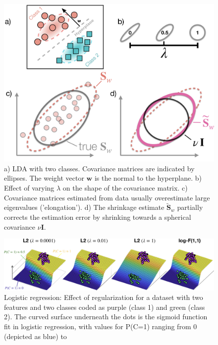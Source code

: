 \documentclass[utf8]{frontiersSCNS} %
\newcommand{\w}{\mathbf{w}}
\renewcommand{\S}{\mathbf{S}}
\begin{document}
\begin{figure}[ht!]
\centering\includegraphics[width=\linewidth]{figures/LDA_regularization}
\caption{a) LDA with two classes. Covariance matrices are indicated by ellipses. The weight vector $\w$ is the normal to the hyperplane. b) Effect of varying $\lambda$ on the shape of the covariance matrix. c) Covariance matrices estimated from data usually overestimate large eigenvalues ('elongation'). d) The shrinkage estimate $\widetilde{\S}_w$ partially corrects the estimation error by shrinking towards a spherical covariance $\nu\mathbf{I}$.}\label{fig:lda}
\end{figure}

\begin{figure}[ht!]
\centering\includegraphics[width=\linewidth]{figures/logreg_regularization}
\caption{Logistic regression: Effect of regularization for a dataset with two features and two classes coded as purple (class 1) and green (class 2). The curved surface underneath the dots is the sigmoid function fit  in logistic regression, with values for P(C=1) ranging from 0 (depicted as blue) to }\label{fig:logreg}
\end{figure}
\end{document}
